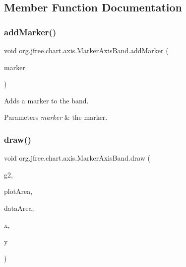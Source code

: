 \subsection{Member Function Documentation}
\mbox{\label{classorg_1_1jfree_1_1chart_1_1axis_1_1_marker_axis_band_a5a608c3a4930980ca45d53487947259e}} 
\subsubsection{\texorpdfstring{add\+Marker()}{addMarker()}}
{\footnotesize\ttfamily void org.\+jfree.\+chart.\+axis.\+Marker\+Axis\+Band.\+add\+Marker (\begin{DoxyParamCaption}\item[{\mbox{\hyperlink{classorg_1_1jfree_1_1chart_1_1plot_1_1_interval_marker}{Interval\+Marker}}}]{marker }\end{DoxyParamCaption})}

Adds a marker to the band.


\begin{DoxyParams}{Parameters}
{\em marker} & the marker. \\
\hline
\end{DoxyParams}
\mbox{\label{classorg_1_1jfree_1_1chart_1_1axis_1_1_marker_axis_band_aef22218740d425740beef81c4c370964}} 
\subsubsection{\texorpdfstring{draw()}{draw()}}
{\footnotesize\ttfamily void org.\+jfree.\+chart.\+axis.\+Marker\+Axis\+Band.\+draw (\begin{DoxyParamCaption}\item[{Graphics2D}]{g2,  }\item[{Rectangle2D}]{plot\+Area,  }\item[{Rectangle2D}]{data\+Area,  }\item[{double}]{x,  }\item[{double}]{y }\end{DoxyParamCaption})}

